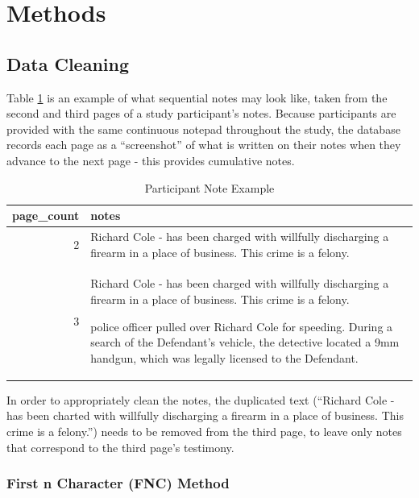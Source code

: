 \documentclass[print]{nuthesis}
\begin{document}
\hypertarget{methods-1}{%
\section{Methods}\label{methods-1}}

\hypertarget{data-cleaning}{%
\subsection{Data Cleaning}\label{data-cleaning}}

Table \ref{tab:noteexample} is an example of what sequential notes may look like, taken from the second and third pages of a study participant's notes.
Because participants are provided with the same continuous notepad throughout the study, the database records each page as a ``screenshot'' of what is written on their notes when they advance to the next page - this provides cumulative notes.

\begin{table}

\caption{\label{tab:noteexample}Participant Note Example}
\centering
\begin{tabular}[t]{r|l}
\hline
page\_count & notes\\
\hline
2 & Richard Cole - has been charged with willfully discharging a firearm in a place of business. This crime is a felony.\\
\hline
3 & Richard Cole - has been charged with willfully discharging a firearm in a place of business. This crime is a felony. 

police officer pulled over Richard Cole for speeding. During a search of the Defendant's vehicle, the detective located a 9mm handgun, which was legally licensed to the Defendant.\\
\hline
\end{tabular}
\end{table}

In order to appropriately clean the notes, the duplicated text (``Richard Cole - has been charted with willfully discharging a firearm in a place of business. This crime is a felony.'') needs to be removed from the third page, to leave only notes that correspond to the third page's testimony.

\hypertarget{first-n-character-fnc-method}{%
\subsubsection{First n Character (FNC) Method}\label{first-n-character-fnc-method}}
\end{document}
